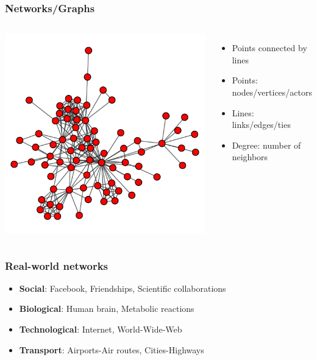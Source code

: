 \documentclass{beamer}
\begin{document}
\begin{frame}
    \frametitle{Networks/Graphs}
    \begin{columns}
            \centering
            \includegraphics[width=\columnwidth]{lesmis.pdf}
            \begin{itemize}
                \setlength\itemsep{2em}
                \item{Points connected by lines}
                \item{Points: nodes/vertices/actors}
                \item{Lines: links/edges/ties}
                \item{Degree: number of neighbors}
            \end{itemize}
    \end{columns}
\end{frame}
\begin{frame}
    \frametitle{Real-world networks}
    \begin{itemize}
        \setlength\itemsep{1em}
            \item{{\bf Social}: Facebook, Friendships, Scientific collaborations}
            \item{{\bf Biological}: Human brain, Metabolic reactions }
            \item{{\bf Technological}: Internet, World-Wide-Web}
            \item{{\bf Transport}: Airports-Air routes, Cities-Highways}
    \end{itemize}
\end{frame}
\end{document}
